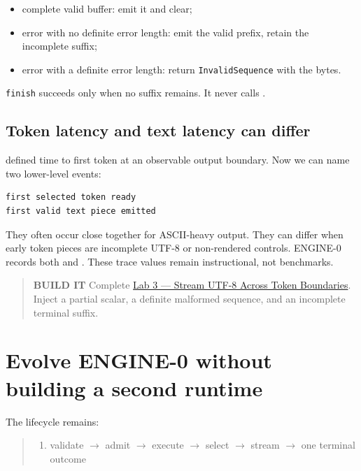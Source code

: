 \begin{itemize}
\tightlist
\item
  complete valid buffer: emit it and clear;
\item
  error with no definite error length: emit the valid prefix, retain the
  incomplete suffix;
\item
  error with a definite error length: return \texttt{InvalidSequence}
  with the bytes.
\end{itemize}

\texttt{finish} succeeds only when no suffix remains. It never calls
\texttt{}.

\subsection{Token latency and text latency can
differ}\label{token-latency-and-text-latency-can-differ}

 defined time to first token at an observable output boundary.
Now we can name two lower-level events:

\begin{verbatim}
first selected token ready
first valid text piece emitted
\end{verbatim}

They often occur close together for ASCII-heavy output. They can differ
when early token pieces are incomplete UTF-8 or non-rendered controls.
ENGINE-0 records both \texttt{} and
\texttt{}. These trace values remain
instructional, not benchmarks.

\begin{quote}
\textbf{BUILD IT} Complete
\href{https://github.com/hermonai/inside-the-llm-engine/blob/astra-visual-rewrite/labs/lab-03-stream-utf8-across-tokens.md}{Lab
3 --- Stream UTF-8 Across Token Boundaries}. Inject a partial scalar, a
definite malformed sequence, and an incomplete terminal suffix.
\end{quote}

\section{Evolve ENGINE-0 without building a second
runtime}\label{evolve-engine-0-without-building-a-second-runtime}

The  lifecycle remains:

\begin{quote}
\begin{enumerate}
\item validate  \(\longrightarrow\)  admit  \(\longrightarrow\)  execute  \(\longrightarrow\)  select  \(\longrightarrow\)  stream  \(\longrightarrow\)  one terminal outcome
\end{enumerate}
\end{quote}

